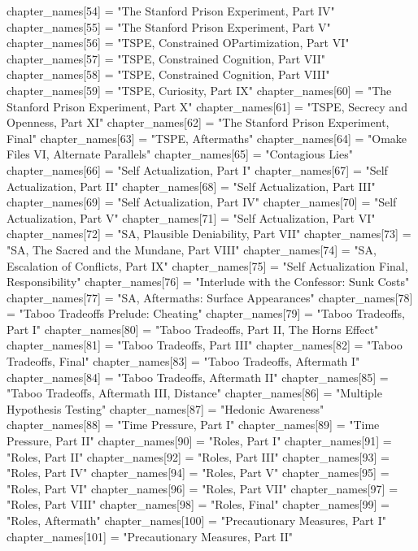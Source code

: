 {    chapter_names[54] = "The Stanford Prison Experiment, Part IV"
    chapter_names[55] = "The Stanford Prison Experiment, Part V"
    chapter_names[56] = "TSPE, Constrained OPartimization, Part VI"
    chapter_names[57] = "TSPE, Constrained Cognition, Part VII"
    chapter_names[58] = "TSPE, Constrained Cognition, Part VIII"
    chapter_names[59] = "TSPE, Curiosity, Part IX"
    chapter_names[60] = "The Stanford Prison Experiment, Part X"
    chapter_names[61] = "TSPE, Secrecy and Openness, Part XI"
    chapter_names[62] = "The Stanford Prison Experiment, Final"
    chapter_names[63] = "TSPE, Aftermaths"
    chapter_names[64] = "Omake Files VI, Alternate Parallels"
    chapter_names[65] = "Contagious Lies"
    chapter_names[66] = "Self Actualization, Part I"
    chapter_names[67] = "Self Actualization, Part II"
    chapter_names[68] = "Self Actualization, Part III"
    chapter_names[69] = "Self Actualization, Part IV"
    chapter_names[70] = "Self Actualization, Part V"
    chapter_names[71] = "Self Actualization, Part VI"
    chapter_names[72] = "SA, Plausible Deniability, Part VII"
    chapter_names[73] = "SA, The Sacred and the Mundane, Part VIII"
    chapter_names[74] = "SA, Escalation of Conflicts, Part IX"
    chapter_names[75] = "Self Actualization Final, Responsibility"
    chapter_names[76] = "Interlude with the Confessor: Sunk Costs"
    chapter_names[77] = "SA, Aftermaths: Surface Appearances"
    chapter_names[78] = "Taboo Tradeoffs Prelude: Cheating"
    chapter_names[79] = "Taboo Tradeoffs, Part I"
    chapter_names[80] = "Taboo Tradeoffs, Part II, The Horns Effect"
    chapter_names[81] = "Taboo Tradeoffs, Part III"
    chapter_names[82] = "Taboo Tradeoffs, Final"
    chapter_names[83] = "Taboo Tradeoffs, Aftermath I"
    chapter_names[84] = "Taboo Tradeoffs, Aftermath II"
    chapter_names[85] = "Taboo Tradeoffs, Aftermath III, Distance"
    chapter_names[86] = "Multiple Hypothesis Testing"
    chapter_names[87] = "Hedonic Awareness"
    chapter_names[88] = "Time Pressure, Part I"
    chapter_names[89] = "Time Pressure, Part II"
    chapter_names[90] = "Roles, Part I"
    chapter_names[91] = "Roles, Part II"
    chapter_names[92] = "Roles, Part III"
    chapter_names[93] = "Roles, Part IV"
    chapter_names[94] = "Roles, Part V"
    chapter_names[95] = "Roles, Part VI"
    chapter_names[96] = "Roles, Part VII"
    chapter_names[97] = "Roles, Part VIII"
    chapter_names[98] = "Roles, Final"
    chapter_names[99] = "Roles, Aftermath"
    chapter_names[100] = "Precautionary Measures, Part I"
    chapter_names[101] = "Precautionary Measures, Part II"
}

